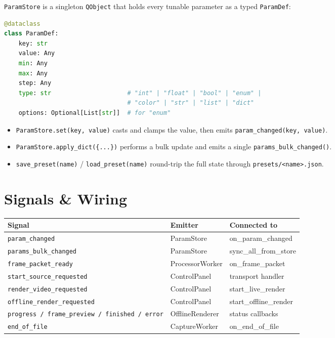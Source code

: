 \documentclass[11pt,a4paper,openany]{report}
\begin{document}
\texttt{ParamStore} is a singleton \texttt{QObject} that holds every
tunable parameter as a typed \texttt{ParamDef}:

\begin{lstlisting}[language=Python]
@dataclass
class ParamDef:
    key: str
    value: Any
    min: Any
    max: Any
    step: Any
    type: str                     # "int" | "float" | "bool" | "enum" |
                                  # "color" | "str" | "list" | "dict"
    options: Optional[List[str]]  # for "enum"
\end{lstlisting}

\begin{itemize}
    \item \texttt{ParamStore.set(key, value)} casts and clamps the value,
        then emits \texttt{param\_changed(key, value)}.
    \item \texttt{ParamStore.apply\_dict(\{...\})} performs a bulk update
        and emits a single \texttt{params\_bulk\_changed()}.
    \item \texttt{save\_preset(name)} / \texttt{load\_preset(name)}
        round-trip the full state through \texttt{presets/<name>.json}.
\end{itemize}

\section{Signals \& Wiring}

\begin{tabularx}{\linewidth}{@{}lll@{}}
    \toprule
    \textbf{Signal} & \textbf{Emitter} & \textbf{Connected to} \\
    \midrule
    \texttt{param\_changed}       & ParamStore       & on\_param\_changed \\
    \texttt{params\_bulk\_changed} & ParamStore      & sync\_all\_from\_store \\
    \texttt{frame\_packet\_ready} & ProcessorWorker  & on\_frame\_packet \\
    \texttt{start\_source\_requested} & ControlPanel & transport handler \\
    \texttt{render\_video\_requested} & ControlPanel & start\_live\_render \\
    \texttt{offline\_render\_requested} & ControlPanel & start\_offline\_render \\
    \texttt{progress / frame\_preview / finished / error} & OfflineRenderer & status callbacks \\
    \texttt{end\_of\_file} & CaptureWorker & on\_end\_of\_file \\
    \bottomrule
\end{tabularx}
\end{document}
